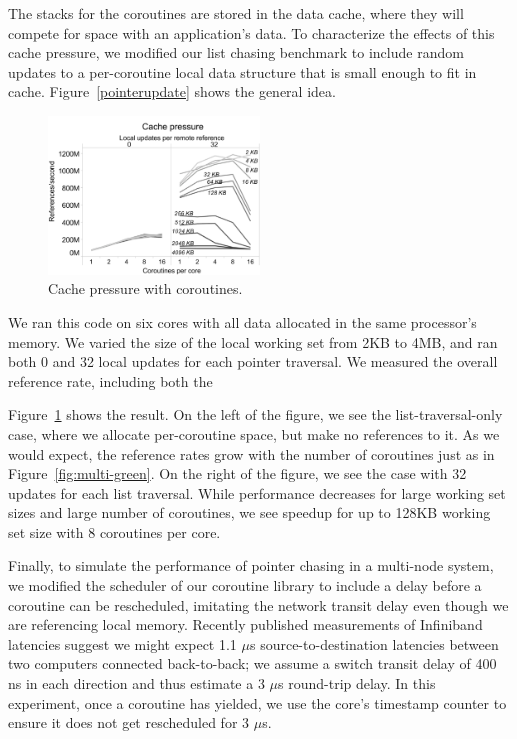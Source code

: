 \documentclass{acm_proc_article-sp}
\begin{document}
The stacks for the coroutines are stored in the data cache, where they
will compete for space with an application's data. To characterize the
effects of this cache pressure, we modified our list chasing benchmark
to include random updates to a per-coroutine local data structure that
is small enough to fit in cache. Figure~\ref{pointerupdate} shows the
general idea.


\begin{figure}[h]
  \begin{center}
    \includegraphics[width=0.5\textwidth]{figures/cache-pressure-edited.pdf}
  \end{center}
  \caption{Cache pressure with coroutines.}
  \label{fig:cache-pressure}
\end{figure}

We ran this code on six cores with all data allocated in the same
processor's memory. We varied the size of the local working set from 2KB
to 4MB, and ran both 0 and 32 local updates for each pointer
traversal. We measured the overall reference rate, including both the 

Figure~\ref{fig:cache-pressure} shows the result. On the left of the
figure, we see the list-traversal-only case, where we allocate
per-coroutine space, but make no references to it. As we would expect,
the reference rates grow with the number of coroutines just as in
Figure~\ref{fig:multi-green}. On the right of the figure, we see the
case with 32 updates for each list traversal. While performance
decreases for large working set sizes and large number of coroutines,
we see speedup for up to 128KB working set size with 8 coroutines per
core.

Finally, to simulate the performance of pointer chasing in a
multi-node system, we modified the scheduler of our coroutine library
to include a delay before a coroutine can be rescheduled, imitating
the network transit delay even though we are referencing local
memory. Recently published measurements of Infiniband latencies
 suggest we might expect 1.1 $\mu$s source-to-destination
latencies between two computers connected back-to-back; we assume a
switch transit delay of 400 ns in each direction and thus estimate a 3
$\mu$s round-trip delay. In this experiment, once a coroutine has
yielded, we use the core's timestamp counter to ensure it does not get
rescheduled for 3 $\mu$s.
\end{document}

